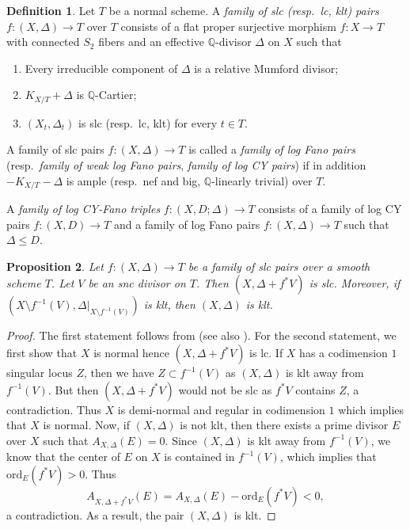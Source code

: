 \documentclass[reqno, 12pt]{amsart}
\newtheorem{prop}{Proposition}[section]
\theoremstyle{definition}
\newtheorem{defn}[prop]{Definition}
\newcommand{\bQ}{\mathbb{Q}}
\newcommand{\ord}{\mathrm{ord}}
\numberwithin{equation}{section}
\begin{document}
\begin{defn}
Let $T$ be a normal scheme.
A \emph{family of slc (resp.\ lc, klt) pairs} $f:(X,\Delta) \to T$ over $T$ consists of a flat proper surjective morphism $f: X\to T$ with connected $S_2$ fibers and an effective $\bQ$-divisor $\Delta$ on $X$ such that
\begin{enumerate}
    \item Every irreducible component of $\Delta$ is a relative Mumford divisor;
    \item $K_{X/T}+\Delta$ is $\bQ$-Cartier;
    \item $(X_t, \Delta_t)$ is slc (resp.\ lc, klt) for every $t\in T$.
\end{enumerate}

A family of slc pairs $f:(X,\Delta) \to T$ is called a \emph{family of log Fano pairs} (resp.\ \emph{family of weak log Fano pairs}, \emph{family of log CY pairs}) if in addition $-K_{X/T}-\Delta$ is ample (resp.\ nef and big, $\bQ$-linearly trivial) over $T$.

A \emph{family of log CY-Fano triples} $f:(X,D;\Delta)\to T$ consists of a family of log CY pairs $f:(X,D)\to T$ and a family of log Fano pairs $f:(X,\Delta)\to T$ such that $\Delta\leq D$.
\end{defn}



\begin{prop}\label{prop:slc-family}
Let $f: (X,\Delta) \to T$ be a family of slc pairs over a smooth scheme $T$. Let $V$ be an snc divisor on $T$. Then $(X, \Delta+f^*V)$ is slc. Moreover, if $(X\setminus f^{-1}(V),\Delta|_{X\setminus f^{-1}(V)})$ is klt, then $(X,\Delta)$ is klt.
\end{prop}

\begin{proof}
The first statement follows from \cite[Proof of Theorem 4.54]{Kol24} (see also \cite[Lemma 2.7]{BABWILD}). For the second statement, we first show that $X$ is normal hence $(X,\Delta+f^*V)$ is lc. If $X$ has a codimension $1$ singular locus $Z$, then we have $Z \subset f^{-1} (V)$ as $(X,\Delta)$ is klt away from $f^{-1}(V)$. But then $(X,\Delta + f^*V)$ would not be slc as $f^*V$ contains $Z$, a contradiction. Thus $X$ is demi-normal and regular in codimension $1$ which implies that $X$ is normal. Now, if $(X,\Delta)$ is not klt, then there exists a prime divisor $E$ over $X$ such that $A_{X,\Delta}(E) = 0$. Since $(X,\Delta)$ is klt away from $f^{-1}(V)$, we know that the center of $E$ on $X$ is contained in $f^{-1}(V)$, which implies that $\ord_E(f^*V)>0$. Thus
\[
A_{X,\Delta + f^*V}(E) = A_{X,\Delta}(E) - \ord_E (f^{*}V) <0,
\]
a contradiction. As a result, the pair $(X,\Delta)$ is klt.
\end{proof}
\end{document}
